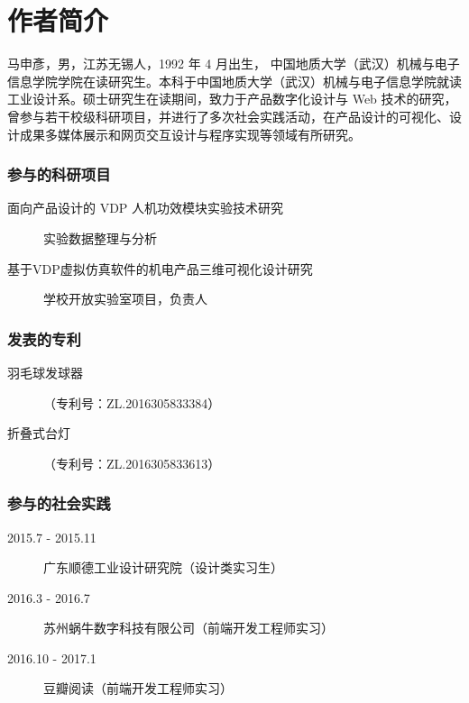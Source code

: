 \chapter*{作者简介}
\begin{spacing}{1.3}

马申彥，男，江苏无锡人，1992 年 4 月出生，
中国地质大学（武汉）机械与电子信息学院学院在读研究生。本科于中国地质大学（武汉）机械与电子信息学院就读工业设计系。硕士研究生在读期间，致力于产品数字化设计与 Web 技术的研究，曾参与若干校级科研项目，并进行了多次社会实践活动，在产品设计的可视化、设计成果多媒体展示和网页交互设计与程序实现等领域有所研究。

% 
\end{spacing}

\subsection*{参与的科研项目}
\begin{description}
	\item[面向产品设计的 VDP 人机功效模块实验技术研究] 实验数据整理与分析
	\item[基于VDP虚拟仿真软件的机电产品三维可视化设计研究] 学校开放实验室项目，负责人
\end{description}

\vskip 12pt

\subsection*{发表的专利}
\begin{description}
	\item[羽毛球发球器]（专利号：ZL.2016305833384）
	\item[折叠式台灯]（专利号：ZL.2016305833613）
\end{description}

\vskip 12pt

\subsection*{参与的社会实践}
\begin{description}
	\item[2015.7 - 2015.11] 广东顺德工业设计研究院（设计类实习生）
	\item[2016.3 - 2016.7] 苏州蜗牛数字科技有限公司（前端开发工程师实习）
	\item[2016.10 - 2017.1] 豆瓣阅读（前端开发工程师实习）
\end{description}